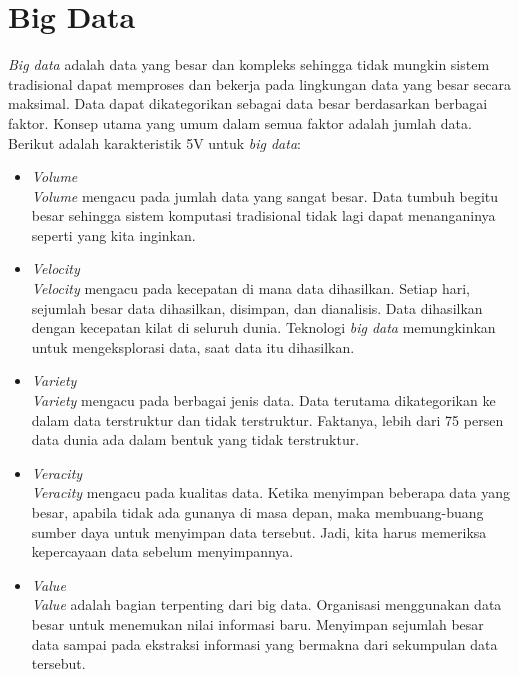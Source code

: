 \section{Big Data}
\textit{Big data} adalah data yang besar dan kompleks sehingga tidak mungkin sistem tradisional dapat memproses dan bekerja pada lingkungan data yang besar secara maksimal. Data dapat dikategorikan sebagai data besar berdasarkan berbagai faktor. Konsep utama yang umum dalam semua faktor  adalah jumlah data. Berikut adalah karakteristik 5V untuk \textit{big data}:

\begin{itemize}
\item \textit{Volume}\\
\textit{Volume} mengacu pada jumlah data yang sangat besar. Data tumbuh begitu besar sehingga sistem komputasi tradisional tidak lagi dapat menanganinya seperti yang kita inginkan.

\item \textit{Velocity}\\
\textit{Velocity} mengacu pada kecepatan di mana data dihasilkan. Setiap hari, sejumlah besar data dihasilkan, disimpan, dan dianalisis. Data dihasilkan dengan kecepatan kilat di seluruh dunia. Teknologi \textit{big data} memungkinkan untuk mengeksplorasi data, saat data itu dihasilkan.

\item \textit{Variety}\\
\textit{Variety} mengacu pada berbagai jenis data. Data terutama dikategorikan ke dalam data terstruktur dan tidak terstruktur. Faktanya, lebih dari 75 persen data dunia ada dalam bentuk yang tidak terstruktur. 

\item \textit{Veracity}\\
\textit{Veracity} mengacu pada kualitas data. Ketika menyimpan beberapa data yang besar, apabila tidak ada gunanya di masa depan, maka membuang-buang sumber daya untuk menyimpan data tersebut. Jadi, kita harus memeriksa kepercayaan data sebelum menyimpannya. 

\item \textit{Value}\\
\textit{Value} adalah bagian terpenting dari big data. Organisasi menggunakan data besar untuk menemukan nilai informasi baru. Menyimpan sejumlah besar data sampai pada ekstraksi informasi yang bermakna dari sekumpulan data tersebut.
\end{itemize}

